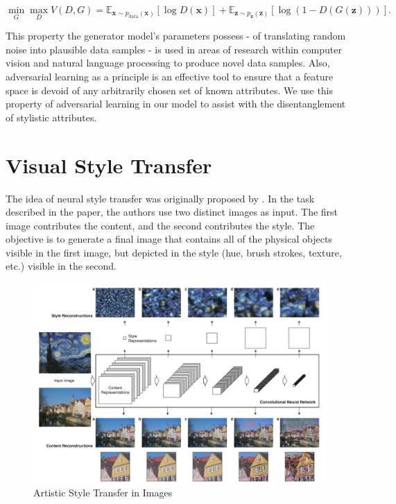 \begin{equation}
	\label{eqn:gan-minimaxgame}
	\min_G \max_D V(D, G) = \mathbb{E}_{\bm{x} \sim p_{\text{data}}(\bm{x})}[\log D(\bm{x})] + \mathbb{E}_{\bm{z} \sim p_{\bm{z}}(\bm{z})}[\log (1 - D(G(\bm{z})))].
\end{equation}

This property the generator model's parameters possess - of translating random noise into plausible data samples - is used in areas of research within computer vision and natural language processing to produce novel data samples. Also, adversarial learning as a principle is an effective tool to ensure that a feature space is devoid of any arbitrarily chosen set of known attributes. We use this property of adversarial learning in our model to assist with the disentanglement of stylistic attributes.


\section{Visual Style Transfer}

The idea of neural style transfer was originally proposed by \cite{gatys2016image}. In the task described in the paper, the authors use two distinct images as input. The first image contributes the content, and the second contributes the style. The objective is to generate a final image that contains all of the physical objects visible in the first image, but depicted in the style (hue, brush strokes, texture, etc.) visible in the second.

\begin{figure}[ht]
	\centering
	\includegraphics[width=\textwidth]{images/image-style-transfer}
	\caption{\label{fig:image-style-transfer} Artistic Style Transfer in Images}
\end{figure}


